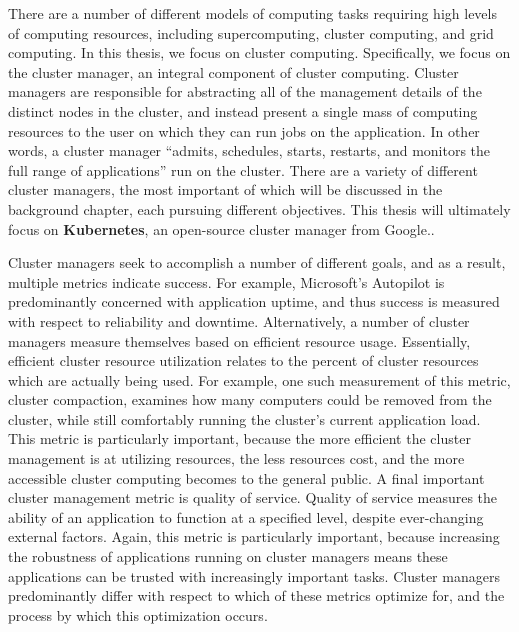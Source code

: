 \documentclass[twoside]{report}
\begin{document}
There are a number of different models of computing tasks requiring high levels
of computing resources, including supercomputing, cluster computing, and grid
computing. In this thesis, we focus on cluster computing. Specifically, we focus on the
cluster manager, an integral component of cluster computing. Cluster managers
are responsible for abstracting all of the management details of the distinct
nodes in the cluster, and instead present a single mass of computing resources
to the user on which they can run jobs on the application. In other words,
a cluster manager ``admits, schedules, starts, restarts, and monitors the full
range of applications'' run on the cluster.\cite[pg. 1]{borg} There are a
variety of different cluster managers, the most important of which will be
discussed in the background chapter, each pursuing different objectives. This
thesis will ultimately focus on \textbf{Kubernetes}, an open-source cluster
manager from Google.\cite{k8s-website}.

Cluster managers seek to accomplish a number of different goals, and as a
result, multiple metrics indicate success. For example, Microsoft's Autopilot is
predominantly concerned with application uptime, and thus success is measured
with respect to reliability and downtime.\cite[pg. 1]{autopilot}
Alternatively, a number of cluster managers measure themselves based on
efficient resource usage.\cite[pg. 7]{borg} Essentially, efficient cluster
resource utilization relates to the percent of cluster resources which are
actually being used. For example, one such measurement of this metric, cluster
compaction, examines how many computers could be removed from the cluster, while
still comfortably running the cluster's current application load.\cite[pg.
5]{evaluating-job-packing-in-warehouse-scale-computing} This metric is
particularly important, because the more efficient the cluster management is at
utilizing resources, the less resources cost, and the more accessible cluster
computing becomes to the general public. A final important
cluster management metric is quality of service. Quality of service measures the
ability of an application to function at a specified level, despite ever-changing
external factors. Again, this metric is particularly important, because
increasing the robustness of applications running on cluster managers means
these applications can be trusted with increasingly important tasks. Cluster
managers predominantly differ with respect to which of these metrics optimize
for, and the process by which this optimization occurs.
\end{document}
